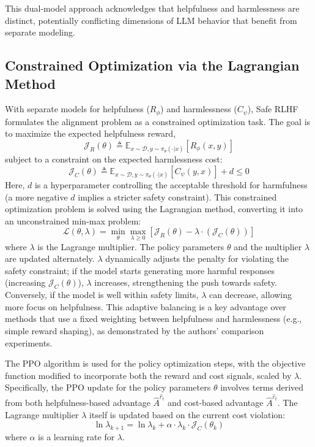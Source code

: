 \documentclass{article}
\begin{document}
This dual-model approach acknowledges that helpfulness and harmlessness are distinct, potentially conflicting dimensions of LLM behavior that benefit from separate modeling.

\subsection{Constrained Optimization via the Lagrangian Method}
With separate models for helpfulness ($R_\phi$) and harmlessness ($C_\psi$), Safe RLHF formulates the alignment problem as a constrained optimization task. \cite{Dai2023SafeRLHF} The goal is to maximize the expected helpfulness reward,
\begin{equation}
    \label{eq:j_r}
    \mathcal{J}_R(\theta) \triangleq \mathbb{E}_{x \sim \mathcal{D}, y \sim \pi_\theta(\cdot|x)}[R_\phi(x,y)]
\end{equation}
subject to a constraint on the expected harmlessness cost:
\begin{equation}
    \label{eq:j_c}
    \mathcal{J}_C(\theta) \triangleq \mathbb{E}_{x \sim \mathcal{D}, y \sim \pi_\theta(\cdot|x)}[C_\psi(y,x)] + d \le 0
\end{equation}
Here, $d$ is a hyperparameter controlling the acceptable threshold for harmfulness (a more negative $d$ implies a stricter safety constraint).
This constrained optimization problem is solved using the Lagrangian method, converting it into an unconstrained min-max problem:
\begin{equation}
    \label{eq:lagrangian_method}
    \mathcal{L}(\theta, \lambda) = \min_{\theta} \max_{\lambda \ge 0} \left[\mathcal{J}_R(\theta) - \lambda \cdot (\mathcal{J}_C(\theta))\right]
\end{equation}
where $\lambda$ is the Lagrange multiplier. The policy parameters $\theta$ and the multiplier $\lambda$ are updated alternately. $\lambda$ dynamically adjusts the penalty for violating the safety constraint; if the model starts generating more harmful responses (increasing $\mathcal{J}_C(\theta)$), $\lambda$ increases, strengthening the push towards safety. Conversely, if the model is well within safety limits, $\lambda$ can decrease, allowing more focus on helpfulness. This adaptive balancing is a key advantage over methods that use a fixed weighting between helpfulness and harmlessness (e.g., simple reward shaping), as demonstrated by the authors' comparison experiments. \cite{Dai2023SafeRLHF}

The PPO algorithm is used for the policy optimization steps, with the objective function modified to incorporate both the reward and cost signals, scaled by $\lambda$. Specifically, the PPO update for the policy parameters $\theta$ involves terms derived from both helpfulness-based advantage $\hat{A}^{\hat{r}_t}$ and cost-based advantage $\hat{A}^{\hat{c}_t}$. \cite{Dai2023SafeRLHF} The Lagrange multiplier $\lambda$ itself is updated based on the current cost violation:
\begin{equation}
    \label{eq:lambda_update}
    \ln \lambda_{k+1} = \ln \lambda_k + \alpha \cdot \lambda_k \cdot \mathcal{J}_C(\theta_k)
\end{equation}
where $\alpha$ is a learning rate for $\lambda$.
\end{document}
